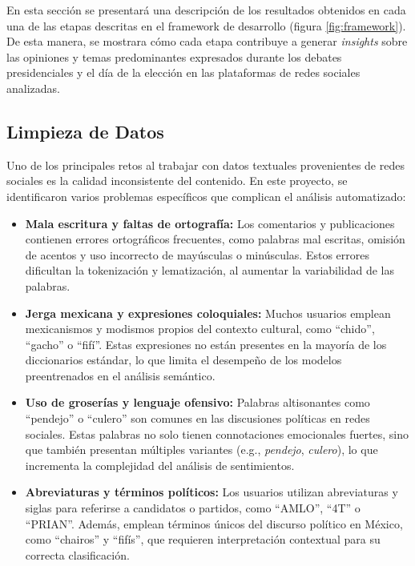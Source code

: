 \documentclass[10pt, a4paper]{article}
\begin{document}
	En esta sección se presentará una descripción de los resultados obtenidos en cada una de las etapas descritas en el framework de desarrollo (figura \ref{fig:framework}). De esta manera, se mostrara cómo cada etapa contribuye a generar \textit{insights} sobre las opiniones y temas predominantes expresados durante los debates presidenciales y el día de la elección en las plataformas de redes sociales analizadas.
	
	\subsection{Limpieza de Datos}
	
	Uno de los principales retos al trabajar con datos textuales provenientes de redes sociales es la calidad inconsistente del contenido. En este proyecto, se identificaron varios problemas específicos que complican el análisis automatizado:
	
	\begin{itemize}
		\item \textbf{Mala escritura y faltas de ortografía:} Los comentarios y publicaciones contienen errores ortográficos frecuentes, como palabras mal escritas, omisión de acentos y uso incorrecto de mayúsculas o minúsculas. Estos errores dificultan la tokenización y lematización, al aumentar la variabilidad de las palabras.
		
		\item \textbf{Jerga mexicana y expresiones coloquiales:} Muchos usuarios emplean mexicanismos y modismos propios del contexto cultural, como “chido”, “gacho” o “fifí”. Estas expresiones no están presentes en la mayoría de los diccionarios estándar, lo que limita el desempeño de los modelos preentrenados en el análisis semántico.
		
		\item \textbf{Uso de groserías y lenguaje ofensivo:} Palabras altisonantes como “pendejo” o “culero” son comunes en las discusiones políticas en redes sociales. Estas palabras no solo tienen connotaciones emocionales fuertes, sino que también presentan múltiples variantes (e.g., \textit{pendejo}, \textit{culero}), lo que incrementa la complejidad del análisis de sentimientos.
		
		\item \textbf{Abreviaturas y términos políticos:} Los usuarios utilizan abreviaturas y siglas para referirse a candidatos o partidos, como “AMLO”, “4T” o “PRIAN”. Además, emplean términos únicos del discurso político en México, como “chairos” y “fifís”, que requieren interpretación contextual para su correcta clasificación.
		
	\end{itemize}
	
\end{document}
